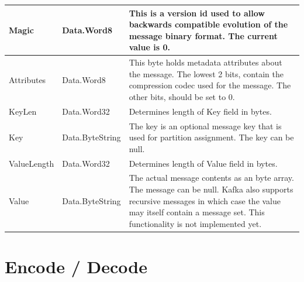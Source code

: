 
\begin{table}[H]
\centering
\begin{tabular}{ l  l  p{10cm} }
\hline
Magic       & Data.Word8      & This is a version id used to allow backwards compatible evolution of the message binary format. The current value is 0.                                         \\ \hline
Attributes  & Data.Word8      & This byte holds metadata attributes about the message. The lowest 2 bits, contain the compression codec used for the message. The other bits, should be set to 0. \\ \hline
KeyLen      & Data.Word32     & Determines length of Key field in bytes.                                                                                                                         \\ \hline
Key         & Data.ByteString & The key is an optional message key that is used for partition assignment. The key can be null.                                                                  \\ \hline
ValueLength & Data.Word32     & Determines length of Value field in bytes.                                                                                                                      \\ \hline
Value       & Data.ByteString & The actual message contents as an byte array. The message can be null. Kafka also supports recursive messages in which case 
                                the value may itself contain a message set. This
                                functionality is not implemented yet.                                                                                                                            \\ \hline
\end{tabular}
\end{table}

\section{Encode / Decode}

